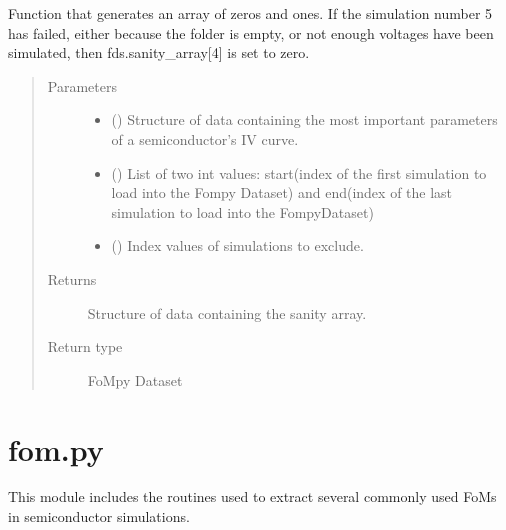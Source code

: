 \documentclass[letterpaper,10pt,english,openany, oneside]{sphinxmanual}
\begin{document}
\begin{fulllineitems}
\label{\detokenize{index:fompy.fds.exclude_indexes}}
Function that generates an array of zeros and ones. If the simulation
number 5 has failed, either because the folder is empty, or not enough voltages
have been simulated, then fds.sanity\_array{[}4{]} is set to zero.
\begin{quote}\begin{description}
\item[{Parameters}] \leavevmode\begin{itemize}
\item {} 
 () \textendash{} Structure of data containing the most important parameters of a semiconductor’s IV curve.

\item {} 
 () \textendash{} List of two int values: start(index of the first simulation to load into the Fompy Dataset)
and end(index of the last simulation to load into the FompyDataset)

\item {} 
 () \textendash{} Index values of simulations to exclude.

\end{itemize}

\item[{Returns}] \leavevmode
{} \textendash{} Structure of data containing the sanity array.

\item[{Return type}] \leavevmode
FoMpy Dataset

\end{description}\end{quote}

\end{fulllineitems}

\label{\detokenize{index:module-fompy.fom}}

\section{fom.py}
\label{\detokenize{index:fom-py}}
This module includes the routines used to extract several commonly used FoMs
in semiconductor simulations.
\end{document}

